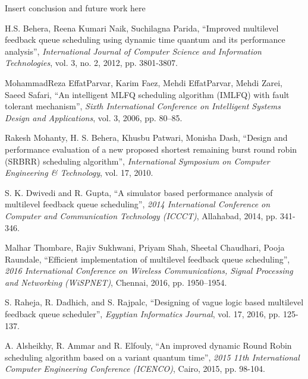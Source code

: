 \documentclass[conference]{IEEEtran}
\begin{document}
Insert conclusion and future work here


\begin{thebibliography}{00}

 H.S. Behera, Reena Kumari Naik, Suchilagna Parida, ``Improved multilevel feedback queue scheduling using dynamic time quantum and its performance analysis'', \textit{International Journal of Computer Science and Information Technologies}, vol. 3, no. 2, 2012, pp. 3801-3807.

 MohammadReza EffatParvar, Karim Faez, Mehdi EffatParvar, Mehdi Zarei, Saeed Safari, ``An intelligent MLFQ scheduling algorithm (IMLFQ) with fault tolerant mechanism'', \textit{Sixth International Conference on Intelligent Systems Design and Applications}, vol. 3, 2006, pp. 80–85.

 Rakesh Mohanty, H. S. Behera, Khusbu Patwari, Monisha Dash, ``Design and performance evaluation of a new proposed shortest remaining burst round robin (SRBRR) scheduling algorithm'', \textit{International Symposium on Computer Engineering \& Technology}, vol. 17, 2010.

 S. K. Dwivedi and R. Gupta, ``A simulator based performance analysis of multilevel feedback queue scheduling'', \textit{2014 International Conference on Computer and Communication Technology (ICCCT)}, Allahabad, 2014, pp. 341-346.

 Malhar Thombare, Rajiv Sukhwani, Priyam Shah, Sheetal Chaudhari, Pooja Raundale, ``Efficient implementation of multilevel feedback queue scheduling'', \textit{2016 International Conference on Wireless Communications, Signal Processing and Networking (WiSPNET)}, Chennai, 2016, pp. 1950–1954.

 S. Raheja, R. Dadhich, and S. Rajpalc, ``Designing of vague logic based multilevel feedback queue scheduler'', \textit{Egyptian Informatics Journal}, vol. 17, 2016, pp. 125-137.

 A. Alsheikhy, R. Ammar and R. Elfouly, ``An improved dynamic Round Robin scheduling algorithm based on a variant quantum time'', \textit{2015 11th International Computer Engineering Conference (ICENCO)}, Cairo, 2015, pp. 98-104.


\end{thebibliography}
\end{document}
